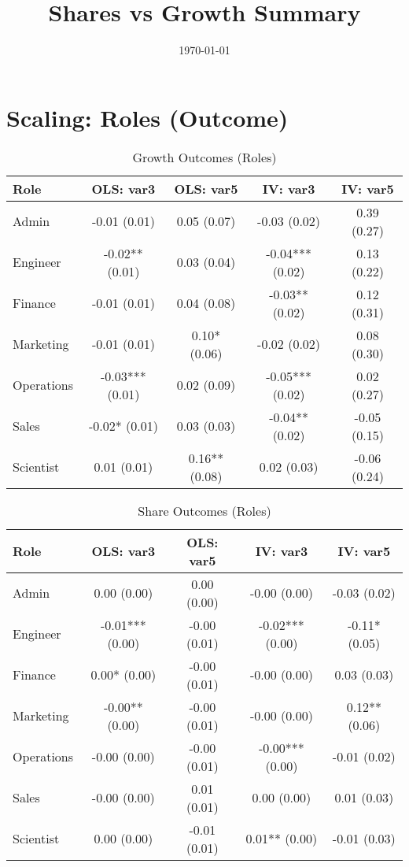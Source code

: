 \documentclass[11pt]{article}
\title{Shares vs Growth Summary}
\date{\today}
\begin{document}
\maketitle

\section{Scaling: Roles (Outcome)}

\begin{table}[H]
\centering
\caption{Growth Outcomes (Roles)}
\begin{tabular}{lcccc}
\toprule
Role & OLS: var3 & OLS: var5 & IV: var3 & IV: var5 \\
\midrule
Admin & -0.01 (0.01) & 0.05 (0.07) & -0.03 (0.02) & 0.39 (0.27) \\
Engineer & -0.02** (0.01) & 0.03 (0.04) & -0.04*** (0.02) & 0.13 (0.22) \\
Finance & -0.01 (0.01) & 0.04 (0.08) & -0.03** (0.02) & 0.12 (0.31) \\
Marketing & -0.01 (0.01) & 0.10* (0.06) & -0.02 (0.02) & 0.08 (0.30) \\
Operations & -0.03*** (0.01) & 0.02 (0.09) & -0.05*** (0.02) & 0.02 (0.27) \\
Sales & -0.02* (0.01) & 0.03 (0.03) & -0.04** (0.02) & -0.05 (0.15) \\
Scientist & 0.01 (0.01) & 0.16** (0.08) & 0.02 (0.03) & -0.06 (0.24) \\
\bottomrule
\end{tabular}
\end{table}

\begin{table}[H]
\centering
\caption{Share Outcomes (Roles)}
\begin{tabular}{lcccc}
\toprule
Role & OLS: var3 & OLS: var5 & IV: var3 & IV: var5 \\
\midrule
Admin & 0.00 (0.00) & 0.00 (0.00) & -0.00 (0.00) & -0.03 (0.02) \\
Engineer & -0.01*** (0.00) & -0.00 (0.01) & -0.02*** (0.00) & -0.11* (0.05) \\
Finance & 0.00* (0.00) & -0.00 (0.01) & -0.00 (0.00) & 0.03 (0.03) \\
Marketing & -0.00** (0.00) & -0.00 (0.01) & -0.00 (0.00) & 0.12** (0.06) \\
Operations & -0.00 (0.00) & -0.00 (0.01) & -0.00*** (0.00) & -0.01 (0.02) \\
Sales & -0.00 (0.00) & 0.01 (0.01) & 0.00 (0.00) & 0.01 (0.03) \\
Scientist & 0.00 (0.00) & -0.01 (0.01) & 0.01** (0.00) & -0.01 (0.03) \\
\bottomrule
\end{tabular}
\end{table}
\end{document}
